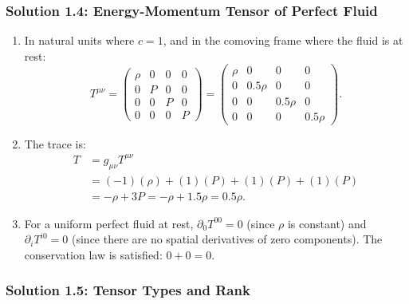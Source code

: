 \subsubsection*{Solution 1.4: Energy-Momentum Tensor of Perfect Fluid}

\begin{enumerate}[label=(\alph*)]
  \item In natural units where $c = 1$, and in the comoving frame where the fluid is at rest:
  \[
    T^{\mu\nu} = \begin{pmatrix}
      \rho & 0 & 0 & 0 \\
      0 & P & 0 & 0 \\
      0 & 0 & P & 0 \\
      0 & 0 & 0 & P
    \end{pmatrix} = \begin{pmatrix}
      \rho & 0 & 0 & 0 \\
      0 & 0.5\rho & 0 & 0 \\
      0 & 0 & 0.5\rho & 0 \\
      0 & 0 & 0 & 0.5\rho
    \end{pmatrix}.
  \]
  
  \item The trace is:
  \[
    \begin{aligned}
      T &= g_{\mu\nu} T^{\mu\nu} \\
        &= (-1)(\rho) + (1)(P) + (1)(P) + (1)(P) \\
        &= -\rho + 3P = -\rho + 1.5\rho = 0.5\rho.
    \end{aligned}
  \]
  
  \item For a uniform perfect fluid at rest, $\partial_0 T^{00} = 0$ (since $\rho$ is constant) and $\partial_i T^{i0} = 0$ (since there are no spatial derivatives of zero components). The conservation law is satisfied: $0 + 0 = 0$. \checkmark
\end{enumerate}

\subsubsection*{Solution 1.5: Tensor Types and Rank}

